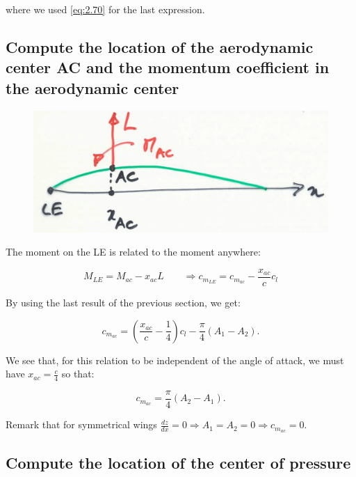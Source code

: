 \documentclass[british,french,11pt, a4paper, openany]{article}
\begin{document}
where we used \eqref{eq:2.70} for the last expression.

\subsection{Compute the location of the aerodynamic center AC and the momentum
	coefficient in the aerodynamic center}

\begin{figure}
	\vspace{-5mm}
	\includegraphics[scale=0.1]{ch2/35}
\end{figure}
The moment on the LE is related to the moment anywhere:

\begin{equation}
M_{LE} = M_{ac} - x_{ac} L \qquad \Rightarrow c_{m_{LE}} =c_{m_{ac}} - \frac{x_{ac}}{c}c_{l} 
\end{equation}

By using the last result of the previous section, we get: 

\begin{equation}
c_{m_{ac}} = \left( \frac{x_{ac}}{c} - \frac{1}{4} \right) c_l - \frac{\pi}{4} (A_1 -A_2).
\end{equation}

We see that, for this relation to be independent of the angle of attack, we must have $x_{ac} = \frac{c}{4}$ so that: 

\begin{equation}
c_{m_{ac}} = \frac{\pi}{4} (A_2 - A_1).
\label{eq:2.77}
\end{equation}

Remark that for symmetrical wings $\frac{dz}{dx} = 0 \Rightarrow A_1 = A_2 = 0 \Rightarrow c_{m_{ac}} = 0$. 

\subsection{Compute the location of the center of pressure}
\end{document}
